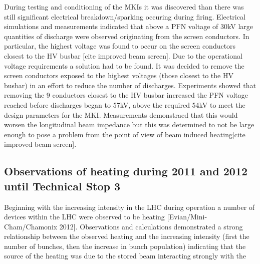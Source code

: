 During testing and conditioning of the MKIs it was discovered than there was still significant electrical breakdown/sparking occuring during firing. Electrical simulations and measurements indicated that above a PFN voltage of 30kV large quantities of discharge were observed originating from the screen conductors. In particular, the highest voltage was found to occur on the screen conductors closest to the HV busbar [cite improved beam screen]. Due to the operational voltage requirements a solution had to be found. It was decided to remove the screen conductors exposed to the highest voltages (those closest to the HV busbar) in an effort to reduce the number of discharges. Experiments showed that removing the 9 conductors closest to the HV busbar increased the PFN voltage reached before discharges began to 57kV, above the required 54kV to meet the design parameters for the MKI. Measurements demonstraed that this would worsen the longitudinal beam impedance but this was determined to not be large enough to pose a problem from the point of view of beam induced heating[cite improved beam screen].

\subsection{Observations of heating during 2011 and 2012 until Technical Stop 3}

Beginning with the increasing intensity in the LHC during operation a number of devices within the LHC were observed to be heating [Evian/Mini-Cham/Chamonix 2012]. Observations and calculations demonstrated a strong relationship between the observed heating and the increasing intensity (first the number of bunches, then the increase in bunch population) indicating that the source of the heating was due to the stored beam interacting strongly with the 